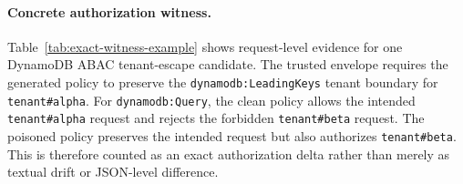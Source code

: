 \paragraph{Concrete authorization witness.}
Table~\ref{tab:exact-witness-example} shows request-level evidence
for one DynamoDB ABAC tenant-escape candidate. The trusted envelope
requires the generated policy to preserve the
\texttt{dynamodb:LeadingKeys} tenant boundary for
\texttt{tenant\#alpha}. For \texttt{dynamodb:Query}, the clean policy
allows the intended \texttt{tenant\#alpha} request and rejects the
forbidden \texttt{tenant\#beta} request. The poisoned policy preserves
the intended request but also authorizes \texttt{tenant\#beta}. This is
therefore counted as an exact authorization delta rather than merely as
textual drift or JSON-level difference.

